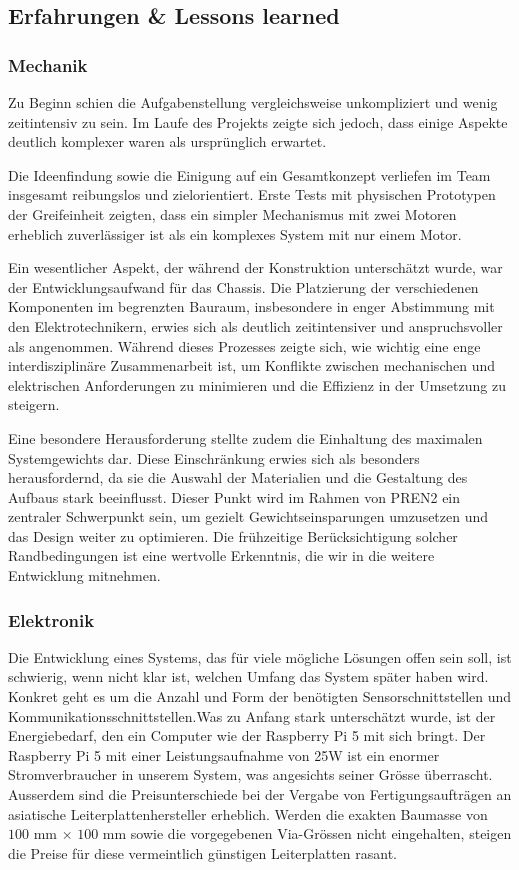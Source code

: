 \documentclass[main.tex]{subfiles} %
\begin{document}
\subsection{Erfahrungen \& Lessons learned}

\subsubsection{Mechanik}

Zu Beginn schien die Aufgabenstellung vergleichsweise unkompliziert und wenig
zeitintensiv zu sein. Im Laufe des Projekts zeigte sich jedoch, dass einige
Aspekte deutlich komplexer waren als ursprünglich erwartet.

Die Ideenfindung sowie die Einigung auf ein Gesamtkonzept verliefen im Team
insgesamt reibungslos und zielorientiert. Erste Tests mit physischen Prototypen
der Greifeinheit zeigten, dass ein simpler Mechanismus mit zwei Motoren
erheblich zuverlässiger ist als ein komplexes System mit nur einem Motor.

Ein wesentlicher Aspekt, der während der Konstruktion unterschätzt wurde, war
der Entwicklungsaufwand für das Chassis. Die Platzierung der verschiedenen
Komponenten im begrenzten Bauraum, insbesondere in enger Abstimmung mit den
Elektrotechnikern, erwies sich als deutlich zeitintensiver und anspruchsvoller
als angenommen. Während dieses Prozesses zeigte sich, wie wichtig eine enge
interdisziplinäre Zusammenarbeit ist, um Konflikte zwischen mechanischen und
elektrischen Anforderungen zu minimieren und die Effizienz in der Umsetzung zu
steigern.

Eine besondere Herausforderung stellte zudem die Einhaltung des maximalen
Systemgewichts dar. Diese Einschränkung erwies sich als besonders
herausfordernd, da sie die Auswahl der Materialien und die Gestaltung des
Aufbaus stark beeinflusst. Dieser Punkt wird im Rahmen von PREN2 ein zentraler
Schwerpunkt sein, um gezielt Gewichtseinsparungen umzusetzen und das Design
weiter zu optimieren. Die frühzeitige Berücksichtigung solcher Randbedingungen
ist eine wertvolle Erkenntnis, die wir in die weitere Entwicklung mitnehmen.

\subsubsection{Elektronik}
Die Entwicklung eines Systems, das für viele mögliche Lösungen offen sein soll,
ist schwierig, wenn nicht klar ist, welchen Umfang das System später haben
wird. Konkret geht es um die Anzahl und Form der benötigten
Sensorschnittstellen und Kommunikationsschnittstellen.Was zu Anfang stark
unterschätzt wurde, ist der Energiebedarf, den ein Computer wie der Raspberry
Pi 5 mit sich bringt. Der Raspberry Pi 5 mit einer Leistungsaufnahme von 25W
ist ein enormer Stromverbraucher in unserem System, was angesichts seiner
Grösse überrascht. Ausserdem sind die Preisunterschiede bei der Vergabe von
Fertigungsaufträgen an asiatische Leiterplattenhersteller erheblich. Werden die
exakten Baumasse von $100$ mm × $100$ mm sowie die vorgegebenen Via-Grössen
nicht eingehalten, steigen die Preise für diese vermeintlich günstigen
Leiterplatten rasant.
\end{document}
